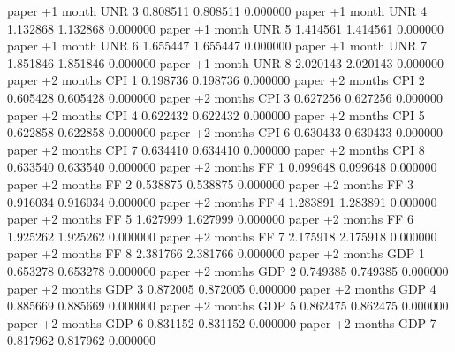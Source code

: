      paper  +1 month      UNR                 3 0.808511       0.808511           0.000000
     paper  +1 month      UNR                 4 1.132868       1.132868           0.000000
     paper  +1 month      UNR                 5 1.414561       1.414561           0.000000
     paper  +1 month      UNR                 6 1.655447       1.655447           0.000000
     paper  +1 month      UNR                 7 1.851846       1.851846           0.000000
     paper  +1 month      UNR                 8 2.020143       2.020143           0.000000
     paper +2 months      CPI                 1 0.198736       0.198736           0.000000
     paper +2 months      CPI                 2 0.605428       0.605428           0.000000
     paper +2 months      CPI                 3 0.627256       0.627256           0.000000
     paper +2 months      CPI                 4 0.622432       0.622432           0.000000
     paper +2 months      CPI                 5 0.622858       0.622858           0.000000
     paper +2 months      CPI                 6 0.630433       0.630433           0.000000
     paper +2 months      CPI                 7 0.634410       0.634410           0.000000
     paper +2 months      CPI                 8 0.633540       0.633540           0.000000
     paper +2 months       FF                 1 0.099648       0.099648           0.000000
     paper +2 months       FF                 2 0.538875       0.538875           0.000000
     paper +2 months       FF                 3 0.916034       0.916034           0.000000
     paper +2 months       FF                 4 1.283891       1.283891           0.000000
     paper +2 months       FF                 5 1.627999       1.627999           0.000000
     paper +2 months       FF                 6 1.925262       1.925262           0.000000
     paper +2 months       FF                 7 2.175918       2.175918           0.000000
     paper +2 months       FF                 8 2.381766       2.381766           0.000000
     paper +2 months      GDP                 1 0.653278       0.653278           0.000000
     paper +2 months      GDP                 2 0.749385       0.749385           0.000000
     paper +2 months      GDP                 3 0.872005       0.872005           0.000000
     paper +2 months      GDP                 4 0.885669       0.885669           0.000000
     paper +2 months      GDP                 5 0.862475       0.862475           0.000000
     paper +2 months      GDP                 6 0.831152       0.831152           0.000000
     paper +2 months      GDP                 7 0.817962       0.817962           0.000000
